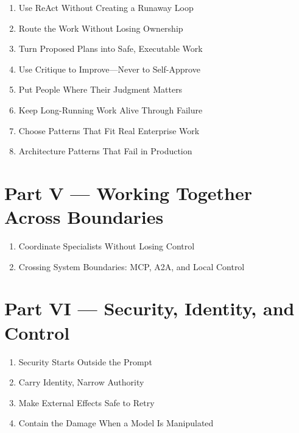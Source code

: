 \begin{enumerate}

\item Use ReAct Without Creating a Runaway Loop

\item Route the Work Without Losing Ownership

\item Turn Proposed Plans into Safe, Executable Work

\item Use Critique to Improve—Never to Self-Approve

\item Put People Where Their Judgment Matters

\item Keep Long-Running Work Alive Through Failure

\item Choose Patterns That Fit Real Enterprise Work

\item Architecture Patterns That Fail in Production

\end{enumerate}

\section{Part V — Working Together Across Boundaries}

\begin{enumerate}

\item Coordinate Specialists Without Losing Control

\item Crossing System Boundaries: MCP, A2A, and Local Control

\end{enumerate}

\section{Part VI — Security, Identity, and Control}

\begin{enumerate}

\item Security Starts Outside the Prompt

\item Carry Identity, Narrow Authority

\item Make External Effects Safe to Retry

\item Contain the Damage When a Model Is Manipulated

\end{enumerate}

